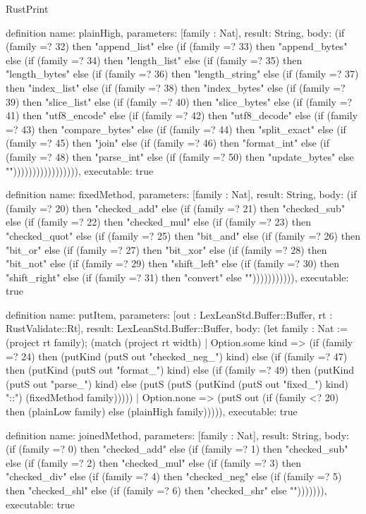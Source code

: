 \begin{lexlean}{RustPrint}
\begin{semanticmodule}
definition{
  name: plainHigh,
  parameters: [family : Nat],
  result: String,
  body: (if (family =? 32) then "append_list" else (if (family =? 33) then "append_bytes" else (if (family =? 34) then "length_list" else (if (family =? 35) then "length_bytes" else (if (family =? 36) then "length_string" else (if (family =? 37) then "index_list" else (if (family =? 38) then "index_bytes" else (if (family =? 39) then "slice_list" else (if (family =? 40) then "slice_bytes" else (if (family =? 41) then "utf8_encode" else (if (family =? 42) then "utf8_decode" else (if (family =? 43) then "compare_bytes" else (if (family =? 44) then "split_exact" else (if (family =? 45) then "join" else (if (family =? 46) then "format_int" else (if (family =? 48) then "parse_int" else (if (family =? 50) then "update_bytes" else ""))))))))))))))))),
  executable: true
}

definition{
  name: fixedMethod,
  parameters: [family : Nat],
  result: String,
  body: (if (family =? 20) then "checked_add" else (if (family =? 21) then "checked_sub" else (if (family =? 22) then "checked_mul" else (if (family =? 23) then "checked_quot" else (if (family =? 25) then "bit_and" else (if (family =? 26) then "bit_or" else (if (family =? 27) then "bit_xor" else (if (family =? 28) then "bit_not" else (if (family =? 29) then "shift_left" else (if (family =? 30) then "shift_right" else (if (family =? 31) then "convert" else ""))))))))))),
  executable: true
}

definition{
  name: putItem,
  parameters: [out : LexLeanStd.Buffer::Buffer, rt : RustValidate::Rt],
  result: LexLeanStd.Buffer::Buffer,
  body: (let family : Nat := (project rt family); (match (project rt width)
    | Option.some kind => (if (family =? 24) then (putKind (putS out "checked_neg_") kind) else (if (family =? 47) then (putKind (putS out "format_") kind) else (if (family =? 49) then (putKind (putS out "parse_") kind) else (putS (putS (putKind (putS out "fixed_") kind) "::") (fixedMethod family)))))
    | Option.none => (putS out (if (family <? 20) then (plainLow family) else (plainHigh family))))),
  executable: true
}

definition{
  name: joinedMethod,
  parameters: [family : Nat],
  result: String,
  body: (if (family =? 0) then "checked_add" else (if (family =? 1) then "checked_sub" else (if (family =? 2) then "checked_mul" else (if (family =? 3) then "checked_div" else (if (family =? 4) then "checked_neg" else (if (family =? 5) then "checked_shl" else (if (family =? 6) then "checked_shr" else ""))))))),
  executable: true
}


\end{semanticmodule}
\end{lexlean}
